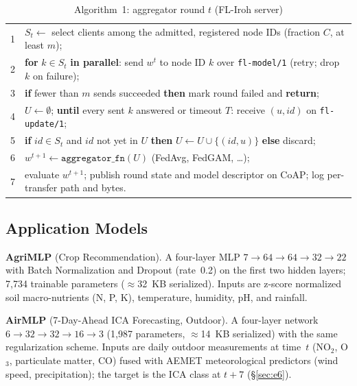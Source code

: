 \begin{table}[t]
\centering
\caption{Algorithm~1: aggregator round $t$ (FL-Iroh server)}
\label{alg:round}
\scriptsize
\begin{tabular}{@{}r p{7.3cm}@{}}
\toprule
1 & $S_t \leftarrow$ select clients among the admitted, registered node IDs (fraction $C$, at least $m$); \\
2 & \textbf{for} $k \in S_t$ \textbf{in parallel}: send $w^{t}$ to node ID $k$ over \texttt{fl-model/1} (retry; drop $k$ on failure); \\
3 & \textbf{if} fewer than $m$ sends succeeded \textbf{then} mark round failed and \textbf{return}; \\
4 & $U \leftarrow \emptyset$; \textbf{until} every sent $k$ answered or timeout $T$: receive $(u, \mathit{id})$ on \texttt{fl-update/1}; \\
5 & \quad \textbf{if} $\mathit{id} \in S_t$ and $\mathit{id}$ not yet in $U$ \textbf{then} $U \leftarrow U \cup \{(\mathit{id}, u)\}$ \textbf{else} discard; \\
6 & $w^{t+1} \leftarrow \texttt{aggregator\_fn}(U)$ \quad (FedAvg, FedGAM, \dots); \\
7 & evaluate $w^{t+1}$; publish round state and model descriptor on CoAP; log per-transfer path and bytes. \\
\bottomrule
\end{tabular}
\end{table}

\subsection{Application Models}

\textbf{AgriMLP} (Crop Recommendation). A four-layer MLP $7 \to 64 \to 64 \to 32 \to 22$ with Batch Normalization and Dropout (rate~0.2) on the first two hidden layers; 7{,}734 trainable parameters ($\approx$32~KB serialized). Inputs are z-score normalized soil macro-nutrients (N, P, K), temperature, humidity, pH, and rainfall.

\textbf{AirMLP} (7-Day-Ahead ICA Forecasting, Outdoor). A four-layer network $6 \to 32 \to 32 \to 16 \to 3$ (1{,}987 parameters, $\approx$14~KB serialized) with the same regularization scheme. Inputs are daily outdoor measurements at time~$t$ (NO$_2$, O$_3$, particulate matter, CO) fused with AEMET meteorological predictors (wind speed, precipitation); the target is the ICA class at $t{+}7$ (\S\ref{sec:e6}).

